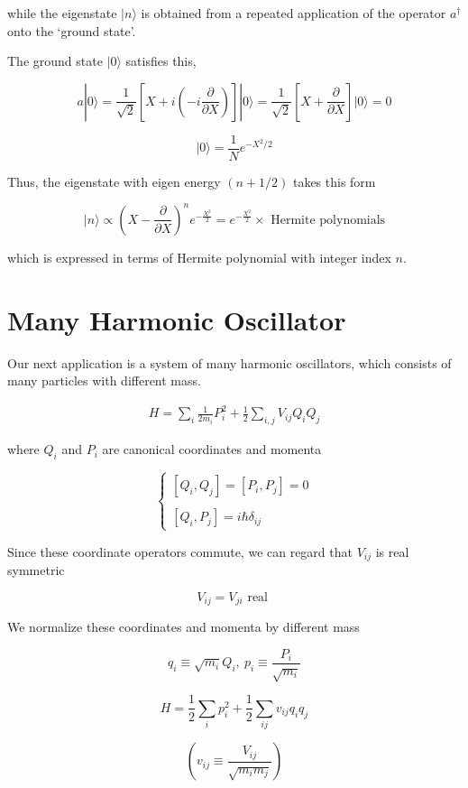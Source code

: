 while the eigenstate $|n\rangle$ is obtained from a repeated application of the operator $a^\dagger$ onto the `ground state'. 

The ground state $|0\rangle$ satisfies this, 

\[a|0\rangle = \frac{1}{\sqrt{2}}\left[X+i\left(-i\frac{\partial}{\partial X}\right)\right]|0\rangle = \frac{1}{\sqrt{2}}\left[X+\frac{\partial}{\partial X}\right]|0\rangle = 0 \]

\[|0\rangle = \frac{1}{N}e^{-X^2/2} \]

Thus, the eigenstate with eigen energy $(n+1/2)$ takes this form

\[|n\rangle \propto \left(X-\frac{\partial}{\partial X}\right)^n e^{-\frac{X^2}{2}} = e^{-\frac{X^2}{2}}\times\text{ Hermite polynomials} \]

which is expressed in terms of Hermite polynomial with integer index $n$. 




\section{Many Harmonic Oscillator}

Our next application is a system of many harmonic oscillators, which consists of many particles with different mass. 

\begin{align}
H = \sum_i \frac{1}{2m_i}P_i^2+\frac{1}{2}\sum_{i,j}V_{ij}Q_iQ_j
\end{align}

where $Q_i$ and $P_i$ are canonical coordinates and momenta

\[\begin{cases}
[Q_i,Q_j] = [P_i,P_j] = 0\\
\ \\
[Q_i,P_j] = i\hbar\delta_{ij}
\end{cases}\]

Since these coordinate operators commute, we can regard that $V_{ij}$ is real symmetric

\[V_{ij} = V_{ji}\text{ real } \]

We normalize these coordinates and momenta by different mass

\[q_i \equiv\sqrt{m_i}Q_i,\ p_i \equiv \frac{P_i}{\sqrt{m_i}} \]

\[H = \frac{1}{2}\sum_{i}p_i^2+\frac{1}{2}\sum_{ij}v_{ij}q_iq_j \]

\[(v_{ij} \equiv \frac{V_{ij}}{\sqrt{m_im_j}} )\]

